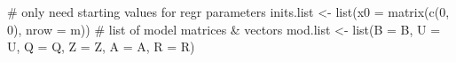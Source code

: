 \begin{Schunk}
\begin{Sinput}
 # only need starting values for regr parameters
 inits.list <- list(x0 = matrix(c(0, 0), nrow = m))
 # list of model matrices & vectors
 mod.list <- list(B = B, U = U, Q = Q, Z = Z, A = A, R = R)
\end{Sinput}
\end{Schunk}
